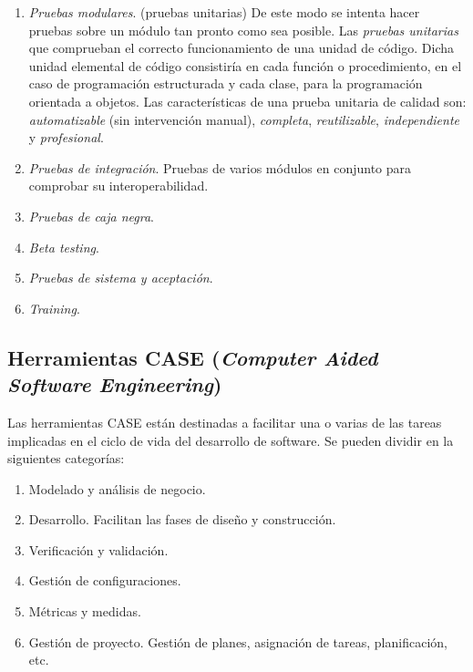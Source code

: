 \begin{enumerate}
\item \emph{Pruebas modulares}. (pruebas unitarias) De este modo se intenta hacer pruebas sobre un módulo tan pronto como sea posible. Las \emph{pruebas unitarias} que comprueban el correcto funcionamiento de una unidad de código. Dicha unidad elemental de código consistiría en cada función o procedimiento, en el caso de programación estructurada y cada clase, para la programación orientada a objetos. Las características de una prueba unitaria de calidad son: \emph{automatizable} (sin intervención manual), \emph{completa},  \emph{reutilizable}, \emph{independiente} y \emph{profesional}.

\item \emph{Pruebas de integración}. Pruebas de varios módulos en conjunto para comprobar su interoperabilidad.

\item \emph{Pruebas de caja negra}.

\item \emph{Beta testing}.

\item \emph{Pruebas de sistema y aceptación}.

\item \emph{Training}.
\end{enumerate}






\subsection{Herramientas CASE (\emph{Computer Aided Software Engineering})}

Las herramientas CASE están destinadas a facilitar una o varias de las tareas implicadas en el ciclo de vida del desarrollo de software. Se pueden dividir en la siguientes categorías:

\begin{enumerate}
\item Modelado y análisis de negocio.
\item Desarrollo. Facilitan las fases de diseño y construcción.
\item Verificación y validación.
\item Gestión de configuraciones.
\item Métricas y medidas.
\item Gestión de proyecto. Gestión de planes, asignación de tareas, planificación, etc.
\end{enumerate}




